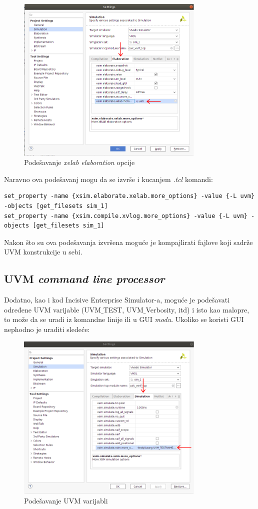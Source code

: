 \begin{figure}[h!]
  \centering
  \includegraphics[width=90mm, scale=0.5]{img/v5_vivado_set_uvm_lib_2.png}
  \caption{Podešavanje \emph{xelab elaboration} opcije}
  \label{fig:v5_vivado_set_uvm_lib_2}
\end{figure}
\pagebreak

Naravno ova podešavanj mogu da se izvrše i kucanjem \emph{.tcl} komandi:

\begin{lstlisting}
set_property -name {xsim.elaborate.xelab.more_options} -value {-L uvm} -objects [get_filesets sim_1]
set_property -name {xsim.compile.xvlog.more_options} -value {-L uvm} -objects [get_filesets sim_1]
\end{lstlisting}

Nakon što su ova podešavanja izvršena moguće je kompajlirati fajlove koji sadrže UVM konstrukcije
u sebi.
\pagebreak
\subsection{UVM \emph{command line processor}}

Dodatno, kao i kod Incisive Enterprise Simulator-a, moguće je podešavati
određene UVM varijable (UVM\(\_\)TEST, UVM\(\_\)Verbosity, itd) i isto kao malopre, to može
da se uradi iz komandne linije ili u GUI \emph{modu}. Ukoliko se koristi GUI nephodno 
je uraditi sledeće:

\begin{figure}[h!]
  \centering
  \includegraphics[width=90mm, scale=0.5]{img/v5_vivado_set_uvm_variables.png}
  \caption{Podešavanje UVM varijabli}
  \label{fig:v5_vivado_set_uvm_variables}
\end{figure}


